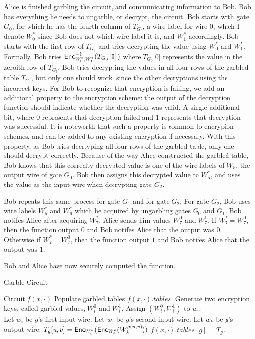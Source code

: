 Alice is finished garbling the circuit, and communicating information to Bob. 
Bob has everything he needs to ungarble, or decrypt, the circuit.
Bob starts with gate $G_0$, for which he has the fourth column of $T_{G_0}$, a wire label for wire $0$, which I denote $W_0^*$ since Bob does not which wire label it is, and $W_1^*$ accordingly.
Bob starts with the first row of $T_{G_0}$ and tries decrypting the value using $W_0^*$ and $W_1^*$.
Formally, Bob tries $\textsf{Enc}^{-1}_{W_0^*, W_1^*}(T_{G_0}\big[0\big])$ where $T_{G_0}\big[0\big]$ represents the value in the zeroith row of $T_{G_0}$.
Bob tries decrypting the values in all four rows of the garbled table $T_{G_0}$, but only one should work, since the other decryptions using the incorrect keys.
For Bob to recognize that encryption is failing, we add an additional property to the encryption scheme: the output of the decryption function should indicate whether the decryption was valid.
A single additional bit, where $0$ represents that decryption failed and $1$ represents that decryption was successful. 
It is noteworth that such a property is common to encrypion schemes, and can be added to any existing encryption if necessary.
With this property, as Bob tries decrtyping all four rows of the garbled table, only one should decrypt correctly.
Because of the way Alice constructed the garbled table, Bob knows that this correclty decrypted value is one of the wire labels of $W_5$, the output wire of gate $G_0$.
Bob then assigns this decrypted value to $W_5^*$, and uses the value as the input wire when decrypting gate $G_2$.

Bob repeats this same process for gate $G_1$ and for gate $G_2$.
For gate $G_2$, Bob uses wire labels $W_5^*$ and $W_6^*$ which he acquired by ungarbling gates $G_0$ and $G_1$.
Bob notifes Alice after acquiring $W_7^*$.
Alice sends him values $W_7^0$ and $W_7^1$.
If $W_7^* = W_7^0$, then the function output $0$ and Bob notifes Alice that the output was $0$.
Otherwise if $W_7^* = W_7^0$, then the function output $1$ and Bob notifes Alice that the output was $1$.

Bob and Alice have now securely computed the function.


\begin{algorithm}
\caption{Garble Circuit}
\label{alg:garble}
\begin{algorithmic}
    \Require Circuit $f(x,\cdot)$ 
    \Ensure Populate garbled tables $f(x,\cdot).tables$.
    \State Generate two encryption keys, called garbled values, $W_i^0$ and $W_i^1$.
    \State Assign $(W_i^0, W_i^1)$ to $w_i$.
\EndFor \\

    \State Let $w_i$ be $g$'s first input wire.
    \State Let $w_j$ be $g$'s second input wire.
    \State Let $w_k$ be $g$'s output wire.
    \State $T_g[u,v] = \textsf{Enc}_{W_i^u}( \textsf{Enc}_{W_j^v} ( W_k^{g(u,v)}))$
    \EndFor
    \State $f(x,\cdot).tables[g] = T_g$.
\EndFor
\end{algorithmic}
\end{algorithm}

